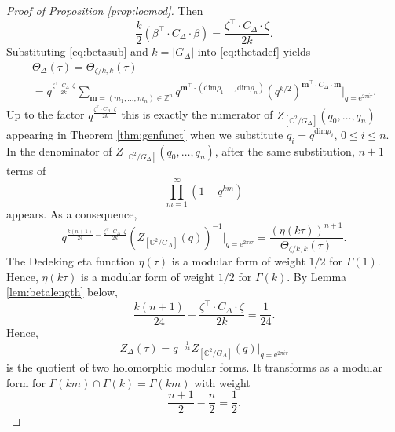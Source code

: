 \documentclass[11pt,a4paper]{amsart}
\theoremstyle{definition}
\newcommand{\SZ}{\mathbb{Z}}                    %
\newcommand{\SC}{\mathbb{C}}                    %
\begin{document}
\begin{proof}[{Proof of Proposition \ref{prop:locmod}}]
Then
\[ \frac{k}{2}\left(\beta^\top \cdot C_\Delta \cdot \beta\right)=  \frac{\zeta^\top \cdot C_\Delta \cdot \zeta}{2k}. \]
Substituting \eqref{eq:betasub} and $k=|G_\Delta|$ into \eqref{eq:thetadef} yields
\begin{gather*}\Theta_{ \Delta }(\tau ) = \Theta_{ \zeta/k ,k}(\tau )  \\ 
= q^{\frac{\zeta^\top \cdot C_\Delta \cdot \zeta}{2k}}\sum_{ \mathbf{m}=(m_1,\dots,m_n) \in \SZ^n } q^{\mathbf{m}^\top \cdot ( \mathrm{dim} \rho_1 ,\dots, \mathrm{dim} \rho_n) } (q^{k/2})^{\mathbf{m}^\top \cdot C_\Delta \cdot \mathbf{m}}\Big|_{q=\mathrm{e}^{2 \pi i \tau}}. 
\end{gather*}
Up to the factor $q^{ \frac{\zeta^\top \cdot C_\Delta \cdot \zeta}{2k}}$ this is exactly the numerator of $Z_{[\SC^2/G_\Delta]}(q_0,\dots,q_n)$ appearing in Theorem \ref{thm:genfunct} when we substitute $q_i=q^{\mathrm{dim} \rho_i}$, $0 \leq i \leq n$. In the denominator of $Z_{[\SC^2/G_\Delta]}(q_0,\dots,q_n)$, after the same substitution, $n+1$ terms of 
\[\prod_{m=1}^{\infty}(1-q^{km})\] 
appears. As a consequence,
\[ q^{\frac{k(n+1)}{24} - \frac{\zeta^\top \cdot C_\Delta \cdot \zeta}{2k}}(Z_{[\SC^2/G_\Delta]}(q))^{-1} \Big|_{q=\mathrm{e}^{2 \pi i \tau}} = \frac{(\eta(k\tau))^{n+1}}{\Theta_{\zeta/k ,k}(\tau )}. \]
The Dedeking eta function $\eta(\tau)$ is a modular form of weight $1/2$ for $\Gamma(1)$. Hence, $\eta(k\tau)$ is a modular form of weight $1/2$ for $\Gamma(k)$.
By Lemma \ref{lem:betalength} below,
\[ \frac{k(n+1)}{24} - \frac{\zeta^\top \cdot C_\Delta \cdot \zeta}{2k}=\frac{1}{24}. \]
Hence,
\[ Z_{\Delta}(\tau)=q^{-\frac{1}{24}}Z_{[\SC^2/G_\Delta]}(q)\Big|_{q=\mathrm{e}^{2 \pi i \tau}} \]
is the quotient of two holomorphic modular forms. It transforms as a modular form for $\Gamma(km)\cap \Gamma(k)=\Gamma(km)$ with weight 
\[ \frac{n+1}{2}-\frac{n}{2}=\frac{1}{2}. \]
\end{proof}
\end{document}
